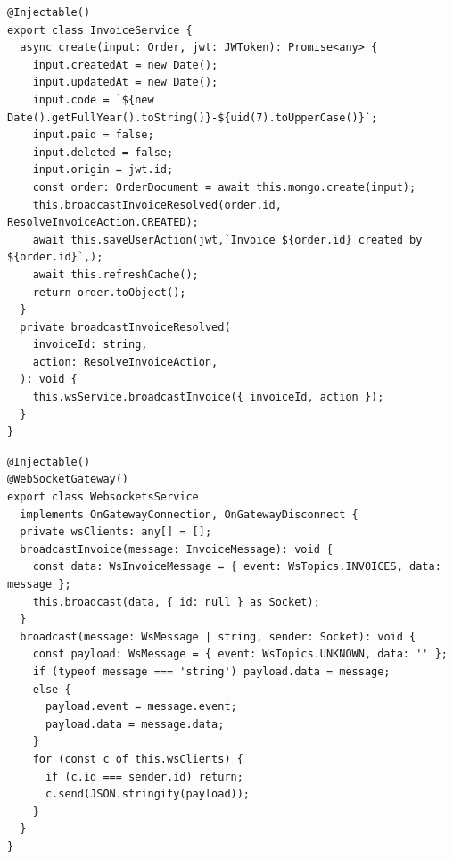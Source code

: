 \begin{lstlisting}[caption={Invoice service: Crear nuevo pedido},label=cod:service-invoice-create-order]
@Injectable()
export class InvoiceService {
  async create(input: Order, jwt: JWToken): Promise<any> {
    input.createdAt = new Date();
    input.updatedAt = new Date();
    input.code = `${new Date().getFullYear().toString()}-${uid(7).toUpperCase()}`;
    input.paid = false;
    input.deleted = false;
    input.origin = jwt.id;
    const order: OrderDocument = await this.mongo.create(input);
    this.broadcastInvoiceResolved(order.id, ResolveInvoiceAction.CREATED);
    await this.saveUserAction(jwt,`Invoice ${order.id} created by ${order.id}`,);
    await this.refreshCache();
    return order.toObject();
  }
  private broadcastInvoiceResolved(
    invoiceId: string,
    action: ResolveInvoiceAction,
  ): void {
    this.wsService.broadcastInvoice({ invoiceId, action });
  }
}
\end{lstlisting}
\begin{lstlisting}[caption={Websocket service: Difusión de mensajes},label=cod:service-websocket-broadcast]
@Injectable()
@WebSocketGateway()
export class WebsocketsService
  implements OnGatewayConnection, OnGatewayDisconnect {
  private wsClients: any[] = [];
  broadcastInvoice(message: InvoiceMessage): void {
    const data: WsInvoiceMessage = { event: WsTopics.INVOICES, data: message };
    this.broadcast(data, { id: null } as Socket);
  }
  broadcast(message: WsMessage | string, sender: Socket): void {
    const payload: WsMessage = { event: WsTopics.UNKNOWN, data: '' };
    if (typeof message === 'string') payload.data = message;
    else {
      payload.event = message.event;
      payload.data = message.data;
    }
    for (const c of this.wsClients) {
      if (c.id === sender.id) return;
      c.send(JSON.stringify(payload));
    }
  }
}
\end{lstlisting}
\clearpage

